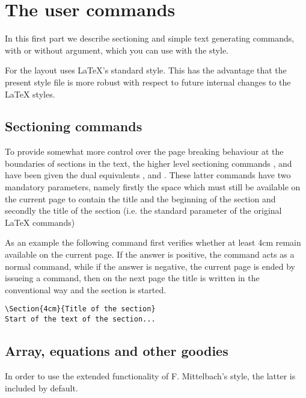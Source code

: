 \tableofcontents

\clearpage
{}
\setcounter{page}{1}
\chapter{The user commands}

In this first part we describe sectioning and simple
text generating commands, with or without argument, which
you can use with the  style.

For the layout  uses \LaTeX's standard 
 style.
This has the advantage that the present style file
is more robust with respect to future internal changes to the \LaTeX{} styles.

\section{Sectioning commands}

To provide somewhat more control over the page breaking behaviour at
the boundaries of sections in the text, the higher level sectioning
commands ,  and 
have been given the dual equivalents 
,  and .
These latter commands have two mandatory parameters, namely
firstly the space which must still be available on the current page
to contain the title and the beginning of the section and secondly
the title of the section (i.e. the standard parameter
of the original \LaTeX{} commands)

As an example the following command first verifies whether at least 4cm
remain available on the current page. If the answer is positive,
the command acts as a normal  command, while if the
answer is negative, the current page is ended by issueing a 
command, then on the next page the title is written in the 
conventional way and the section is started.
\begin{verbatim}
\Section{4cm}{Title of the section}
Start of the text of the section...
\end{verbatim}

\section{Array, equations and other goodies}

In order to use the extended functionality of
F. Mittelbach's  style, the latter is included by default.

